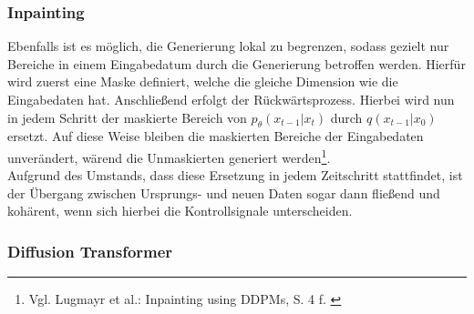 \subsubsection{Inpainting}

Ebenfalls ist es möglich, die Generierung lokal zu begrenzen, sodass gezielt nur Bereiche in einem Eingabedatum durch die Generierung betroffen werden. Hierfür wird zuerst eine Maske definiert, welche die gleiche Dimension wie die Eingabedaten hat. Anschließend erfolgt der Rückwärtsprozess. Hierbei wird nun in jedem Schritt der maskierte Bereich von $p_\theta(x_{t-1} | x_{t})$ durch $q(x_{t-1}|x_0)$ ersetzt. Auf diese Weise bleiben die maskierten Bereiche der Eingabedaten unverändert, wärend die Unmaskierten generiert werden\footnote{
    Vgl. Lugmayr et al.: Inpainting using DDPMs, S. 4 f.
    \cite{lugmayr2022repaint}
}. \\
Aufgrund des Umstands, dass diese Ersetzung in jedem Zeitschritt stattfindet, ist der Übergang zwischen Ursprungs- und neuen Daten sogar dann fließend und kohärent, wenn sich hierbei die Kontrollsignale unterscheiden.




\subsubsection{Diffusion Transformer}
\label{subsubsec:DiT}

